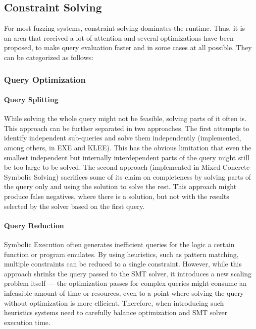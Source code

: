 \documentclass{article}
\begin{document}
\begin{multicols}{2}
    \subsection{Constraint Solving}
    \label{ConstraintSolving}
    For most fuzzing systems, constraint solving dominates the runtime. Thus, it is an area that received a lot of attention and several optimizations have been proposed, to make query evaluation faster and in some cases at all possible. They can be categorized as follows:

    \subsubsection{Query Optimization}
    \paragraph{Query Splitting} While solving the whole query might not be feasible, solving parts of it often is. This approach can be further separated in two approaches. The first attempts to identify independent sub-queries and solve them independently (implemented, among others, in EXE\cite{EXE} and KLEE\cite{KLEE}). This has the obvious limitation that even the smallest independent but internally interdependent parts of the query might still be too large to be solved. The second approach (implemented in Mixed Concrete-Symbolic Solving\cite{MCSS}) sacrifices some of its claim on completeness by solving parts of the query only and using the solution to solve the rest. This approach might produce false negatives, where there is a solution, but not with the results selected by the solver based on the first query.

    \paragraph{Query Reduction} Symbolic Execution often generates inefficient queries for the logic a certain function or program emulates. By using heuristics, such as pattern matching, multiple constraints can be reduced to a single constraint. However, while this approach shrinks the query passed to the SMT solver, it introduces a new scaling problem itself — the optimization passes for complex queries might consume an infeasible amount of time or resources, even to a point where solving the query without optimization is more efficient. Therefore, when introducing such heuristics systems need to carefully balance optimization and SMT solver execution time.


\end{multicols}
\end{document}
